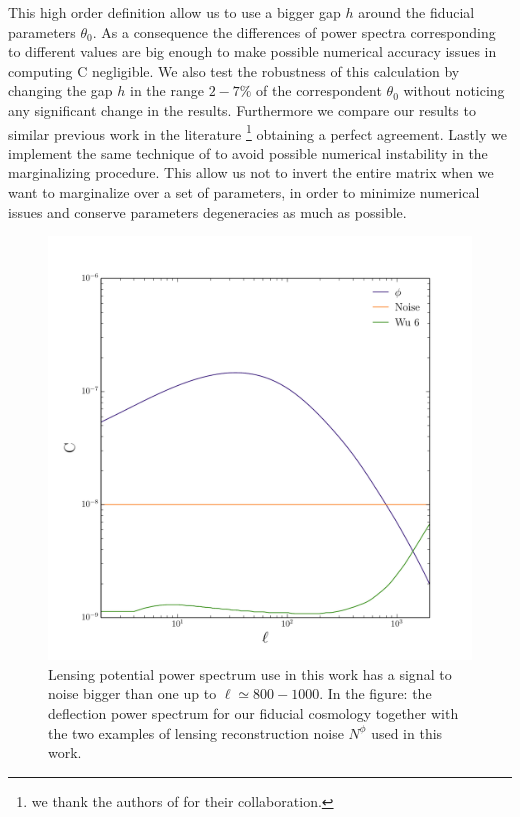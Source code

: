 \documentclass[aps,prd,reprint,superscriptaddress]{revtex4-1}
\begin{document}
This high order definition allow us to use a bigger gap $h$ around the fiducial parameters $\theta_{0}$. As a consequence the differences of power spectra corresponding to different values are big enough to make possible numerical accuracy issues in computing C negligible.
We also test the robustness of this calculation by changing the gap $h$ in the range $2-7\%$ of the correspondent $\theta_{0}$ without noticing any significant change in the results.
Furthermore we compare our results to similar previous work in the literature \footnote{we thank the authors of \cite{pan:2015} for their collaboration.} obtaining a perfect agreement.
Lastly we implement the same technique of \cite{2006astro.ph..9591A} to avoid possible numerical instability in the marginalizing procedure. This allow us not to invert the entire matrix when we want to marginalize over a set of parameters, in order to minimize numerical issues and conserve parameters degeneracies as much as possible.


\begin{figure}[htbp]
\begin{center}
\includegraphics[scale=0.4]{PS_phi_with_noise.pdf}
\caption{Lensing potential power spectrum use in this work has a signal to noise bigger than one up to $\ell\simeq800-1000$.
In the figure: the deflection power spectrum for our fiducial cosmology together with the two examples of lensing reconstruction noise $N^{\phi}$ used in this work.}
\label{fig:phi-cl-noise}
\end{center}
\end{figure}
\end{document}
